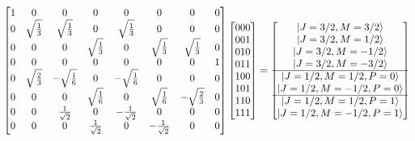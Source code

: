 \begin{align}
\begin{bmatrix}
1 &0 &0 &0 &0 &0 &0 &0 \\
0 &\sqrt{\frac{1}{3}} &\sqrt{\frac{1}{3}} &0 &\sqrt{\frac{1}{3}} &0 &0 &0\\
0 &0 &0 &\sqrt{\frac{1}{3}} &0 &\sqrt{\frac{1}{3}} &\sqrt{\frac{1}{3}} &0 \\
0 &0 &0 &0 &0 &0 &0 &1 \\
0 &\sqrt{\frac{2}{3}} &-\sqrt{\frac{1}{6}} &0 &-\sqrt{\frac{1}{6}} &0 &0 &0\\
0 &0 &0 &\sqrt{\frac{1}{6}} &0 &\sqrt{\frac{1}{6}} &-\sqrt{\frac{2}{3}} &0 \\
0 &0 &\frac{1}{\rtwo} &0 &-\frac{1}{\rtwo} &0 &0 &0 \\
0 &0 &0 &\frac{1}{\rtwo} &0 &-\frac{1}{\rtwo} &0 &0 \\
\end{bmatrix}
%
\begin{bmatrix}
000 \\
001 \\
010 \\
011 \\
100 \\
101 \\
110 \\
111 \\
\end{bmatrix}
=
\begin{bmatrix}
\ket{J=3/2, M=3/2} \\
\ket{J=3/2, M=1/2} \\
\ket{J=3/2, M=-1/2} \\
\ket{J=3/2, M=-3/2} \\ 
\hline
\ket{J=1/2, M=1/2, P=0} \\
\ket{J=1/2, M=-1/2, P=0} \\
\hline
\ket{J=1/2, M=1/2, P=1} \\
\ket{J=1/2, M=-1/2, P=1} \\ 
\end{bmatrix}
\label{eq:3qubitcg}
\end{align}



